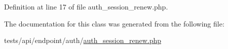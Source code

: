 Definition at line 17 of file auth\+\_\+session\+\_\+renew.\+php.



The documentation for this class was generated from the following file\+:\begin{DoxyCompactItemize}
\item 
tests/api/endpoint/auth/\hyperlink{tests_2api_2endpoint_2auth_2auth__session__renew_8php}{auth\+\_\+session\+\_\+renew.\+php}\end{DoxyCompactItemize}
